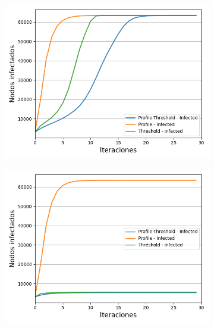 \documentclass{article}
\begin{document}
\begin{figure}[!tbp]
\begin{subfigure}[b]{0.5\textwidth}
		\caption{}
		\label{fig:f43}
	\end{subfigure}
	\hfill
	\begin{subfigure}[b]{0.5\textwidth}
		\includegraphics[width=\textwidth, height=\textwidth]{../Images/Fig 4 d).png}
		\caption{}
		\label{fig:f44}
	\end{subfigure}
	\hfil
	\begin{subfigure}[b]{0.5\textwidth}
		\includegraphics[width=\textwidth, height=\textwidth]{../Images/Fig 4 e).png}

\end{subfigure}
\end{figure}
\end{document}
